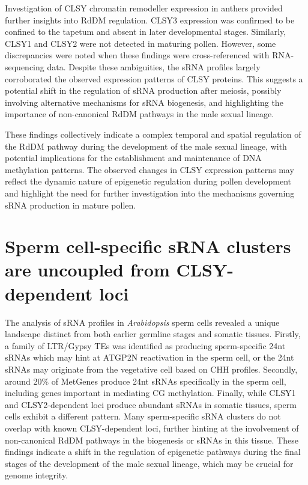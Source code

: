 Investigation of CLSY chromatin remodeller expression in anthers provided further insights into RdDM regulation. CLSY3 expression was confirmed to be confined to the tapetum and absent in later developmental stages. Similarly, CLSY1 and CLSY2 were not detected in maturing pollen. However, some discrepancies were noted when these findings were cross-referenced with RNA-sequencing data. Despite these ambiguities, the sRNA profiles largely corroborated the observed expression patterns of CLSY proteins. This suggests a potential shift in the regulation of sRNA production after meiosis, possibly involving alternative mechanisms for sRNA biogenesis, and highlighting the importance of non-canonical RdDM pathways in the male sexual lineage.

These findings collectively indicate a complex temporal and spatial regulation of the RdDM pathway during the development of the male sexual lineage, with potential implications for the establishment and maintenance of DNA methylation patterns. The observed changes in CLSY expression patterns may reflect the dynamic nature of epigenetic regulation during pollen development and highlight the need for further investigation into the mechanisms governing sRNA production in mature pollen.

\section{Sperm cell-specific sRNA clusters are uncoupled from CLSY-dependent loci}

The analysis of sRNA profiles in \textit{Arabidopsis} sperm cells revealed a unique landscape distinct from both earlier germline stages and somatic tissues. Firstly, a family of LTR/Gypsy TEs was identified as producing sperm-specific 24nt sRNAs which may hint at ATGP2N reactivation in the sperm cell, or the 24nt sRNAs may originate from the vegetative cell based on CHH profiles. Secondly, around 20\% of MetGenes produce 24nt sRNAs specifically in the sperm cell, including genes important in mediating CG methylation. Finally, while CLSY1 and CLSY2-dependent loci produce abundant sRNAs in somatic tissues, sperm cells exhibit a different pattern. Many sperm-specific sRNA clusters do not overlap with known CLSY-dependent loci, further hinting at the involvement of non-canonical RdDM pathways in the biogenesis or sRNAs in this tissue. These findings indicate a shift in the regulation of epigenetic pathways during the final stages of the development of the male sexual lineage, which may be crucial for genome integrity. 

